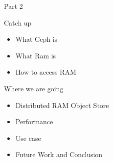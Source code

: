 \begin{frame}{Part 2}
 \begin{block}{Catch up}
        \begin{itemize}
            \item What Ceph is 
            \item What Ram is
            \item How to access RAM
        \end{itemize}
    \end{block}
 \begin{block}{Where we are going}
 \begin{itemize}
    \item Distributed RAM Object Store
    \item Performance
    \item Use case
    \item Future Work and Conclusion
 \end{itemize}
 \end{block}
\end{frame}